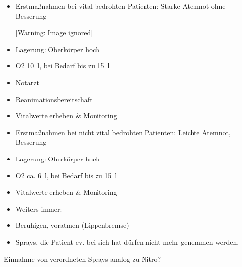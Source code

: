 \documentclass{article}
\begin{document}
\begin{itemize}
\item Erstma{\ss}nahmen bei vital bedrohten Patienten: Starke Atemnot
ohne Besserung

\begin{center}
 [Warning: Image ignored] %

\end{center}
\end{itemize}
\begin{itemize}
\item Lagerung: Oberk\"orper hoch

\item O2 10~l, bei Bedarf bis zu 15~l

\item Notarzt

\item Reanimationsbereitschaft

\end{itemize}
\begin{itemize}
\item Vitalwerte erheben \& Monitoring 

\item Erstma{\ss}nahmen bei nicht vital bedrohten Patienten: Leichte
Atemnot, Besserung

\end{itemize}
\begin{itemize}
\item Lagerung: Oberk\"orper hoch

\item O2 ca. 6~l, bei Bedarf bis zu 15~l

\end{itemize}
\begin{itemize}
\item Vitalwerte erheben \& Monitoring 

\item Weiters immer:

\end{itemize}
\begin{itemize}
\item Beruhigen, voratmen (Lippenbremse)

\item Sprays, die Patient ev. bei sich hat d\"urfen nicht mehr genommen
werden.

\end{itemize}
Einnahme von verordneten Sprays analog zu Nitro?
\end{document}

